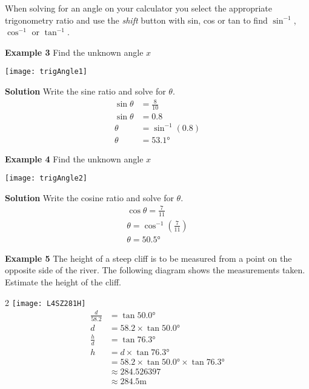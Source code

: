 When solving for an angle on your calculator you select the appropriate trigonometry ratio and use the \emph{shift} button with sin, cos or tan to find $\sin ^{ -1}$, $\cos ^{ -1}$ or $\tan ^{ -1}$. 
\begin{multicols}{2}
	\textbf{Example 3} Find the unknown angle $x$\\
	\begin{center}
		\texttt{[image: trigAngle1]}
	\end{center}
	
	\columnbreak
	\textbf{Solution} Write the sine ratio and solve for $\theta$.\\
	\begin{align*}\sin \theta &= \frac{8}{10}\\
	\sin\theta&=0.8\\
	\theta&=\sin^{-1}(0.8)\\
	\theta&=\ang{53.1}
	\end{align*}
\end{multicols}

\begin{multicols}{2}
	\textbf{Example 4} Find the unknown angle $x$\\
	\begin{center}
		\texttt{[image: trigAngle2]}
	\end{center}
	\columnbreak
	\textbf{Solution} Write the cosine ratio and solve for $\theta$.
	\begin{align*}\cos \theta = \frac{7}{11}\\
	\theta=\cos^{-1} \left(\frac{7}{11}\right)\\
	\theta=\ang{50.5}
	\end{align*}
\end{multicols}

\textbf{Example 5}
The height of a steep cliff is to be measured from a point on the opposite side of the river. The following diagram shows the measurements taken. Estimate the height of the cliff.

\begin {multicols}{2}
\texttt{[image: L4SZ281H]}
\columnbreak
\begin{align*}\frac{d}{58.2} &  =  \tan  \ang{50.0}  \\
d &  =  58.2 \times \tan  \ang{50.0}  \\
\frac{h}{d} &  =  \tan  \ang{76.3}  \\
h &  =  d \times \tan  \ang{76.3}  \\
 &  =  58.2 \times \tan  \ang{50.0}  \times \tan  \ang{76.3}  \\
 &  \approx   284.526397 \\
 &  \approx   284.5 \mbox{m}\end{align*}
\end {multicols}

